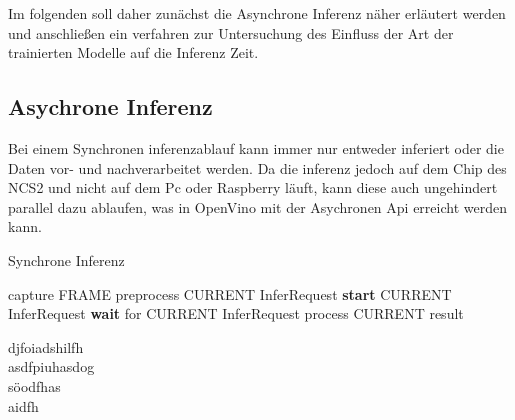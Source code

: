 Im folgenden soll daher zunächst die Asynchrone Inferenz näher 
erläutert werden und anschließen ein verfahren zur Untersuchung 
des Einfluss der Art der trainierten Modelle auf die Inferenz Zeit.

\subsection{Asychrone Inferenz}

Bei einem Synchronen inferenzablauf kann immer nur entweder inferiert oder 
die Daten vor- und nachverarbeitet werden. Da die inferenz jedoch auf dem 
Chip des NCS2 und nicht auf dem Pc oder Raspberry läuft, kann diese auch 
ungehindert parallel dazu ablaufen, was in OpenVino mit der Asychronen Api 
erreicht werden kann.

\vspace{1cm}
\begin{minipage}{0.1\textwidth}
  \hfill
\end{minipage}
\begin{minipage}{0.5\textwidth}
  \begin{algorithm}[H]
    \caption{Synchrone Inferenz}
    \begin{algorithmic}
    \WHILE{\TRUE}
        \STATE capture FRAME
        \STATE preprocess CURRENT InferRequest
        \STATE \textbf{start} CURRENT InferRequest
        \STATE \textbf{wait} for CURRENT InferRequest
        \STATE process CURRENT result
    \ENDWHILE
    \end{algorithmic}
  \end{algorithm}  
\end{minipage}
\begin{minipage}{0.4\textwidth}
  \centering
  \vspace{1cm}
  \def\svgwidth{0.5\textwidth}
  
\end{minipage}

\vspace{1cm}
\begin{figure}[H]
  \centering
  \def\svgwidth{0.8\textwidth}
  
  \caption{}
  \label{}
\end{figure}

djfoiadshilfh
\\
asdfpiuhasdog\\
söodfhas\\
aidfh


